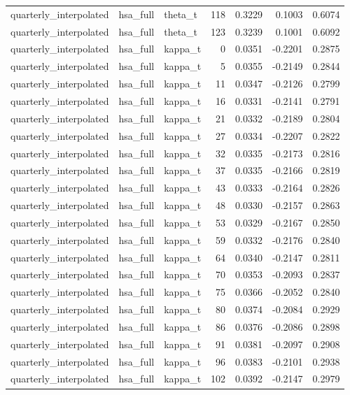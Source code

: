 \begin{tabular}{lllrrrr}
quarterly\_interpolated & hsa\_full & theta\_t & 118 & 0.3229 & 0.1003 & 0.6074 \\
quarterly\_interpolated & hsa\_full & theta\_t & 123 & 0.3239 & 0.1001 & 0.6092 \\
quarterly\_interpolated & hsa\_full & kappa\_t & 0 & 0.0351 & -0.2201 & 0.2875 \\
quarterly\_interpolated & hsa\_full & kappa\_t & 5 & 0.0355 & -0.2149 & 0.2844 \\
quarterly\_interpolated & hsa\_full & kappa\_t & 11 & 0.0347 & -0.2126 & 0.2799 \\
quarterly\_interpolated & hsa\_full & kappa\_t & 16 & 0.0331 & -0.2141 & 0.2791 \\
quarterly\_interpolated & hsa\_full & kappa\_t & 21 & 0.0332 & -0.2189 & 0.2804 \\
quarterly\_interpolated & hsa\_full & kappa\_t & 27 & 0.0334 & -0.2207 & 0.2822 \\
quarterly\_interpolated & hsa\_full & kappa\_t & 32 & 0.0335 & -0.2173 & 0.2816 \\
quarterly\_interpolated & hsa\_full & kappa\_t & 37 & 0.0335 & -0.2166 & 0.2819 \\
quarterly\_interpolated & hsa\_full & kappa\_t & 43 & 0.0333 & -0.2164 & 0.2826 \\
quarterly\_interpolated & hsa\_full & kappa\_t & 48 & 0.0330 & -0.2157 & 0.2863 \\
quarterly\_interpolated & hsa\_full & kappa\_t & 53 & 0.0329 & -0.2167 & 0.2850 \\
quarterly\_interpolated & hsa\_full & kappa\_t & 59 & 0.0332 & -0.2176 & 0.2840 \\
quarterly\_interpolated & hsa\_full & kappa\_t & 64 & 0.0340 & -0.2147 & 0.2811 \\
quarterly\_interpolated & hsa\_full & kappa\_t & 70 & 0.0353 & -0.2093 & 0.2837 \\
quarterly\_interpolated & hsa\_full & kappa\_t & 75 & 0.0366 & -0.2052 & 0.2840 \\
quarterly\_interpolated & hsa\_full & kappa\_t & 80 & 0.0374 & -0.2084 & 0.2929 \\
quarterly\_interpolated & hsa\_full & kappa\_t & 86 & 0.0376 & -0.2086 & 0.2898 \\
quarterly\_interpolated & hsa\_full & kappa\_t & 91 & 0.0381 & -0.2097 & 0.2908 \\
quarterly\_interpolated & hsa\_full & kappa\_t & 96 & 0.0383 & -0.2101 & 0.2938 \\
quarterly\_interpolated & hsa\_full & kappa\_t & 102 & 0.0392 & -0.2147 & 0.2979 \\

\end{tabular}
